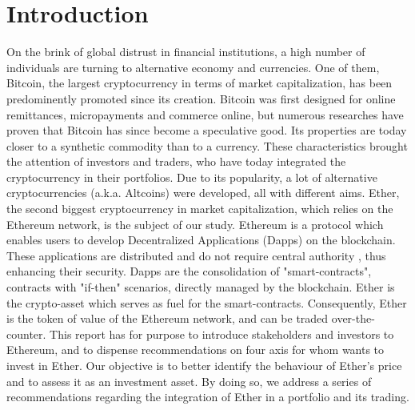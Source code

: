 \documentclass[11pt]{report}
\begin{document}
\chapter*{Introduction}

On the brink of global distrust in financial institutions, a high number of individuals are turning to alternative economy and currencies. One of them, Bitcoin, the largest cryptocurrency in terms of market capitalization, has been predominently  promoted since its creation. Bitcoin was first designed for online remittances, micropayments and commerce online, but numerous researches have proven that Bitcoin has since become a speculative good. Its properties are today closer to a synthetic commodity than to a currency\cite{SELGIN}. These characteristics brought the attention of investors and traders, who have today integrated the cryptocurrency in their portfolios. \medbreak
Due to its popularity, a lot of alternative cryptocurrencies (a.k.a. Altcoins) were developed, all with different aims. Ether, the second biggest cryptocurrency in market capitalization, which relies on the Ethereum network, is the subject of our study.\newline 
Ethereum is a protocol which enables users to develop  Decentralized Applications (Dapps) on the blockchain. These applications are distributed and do not require central authority , thus enhancing their security. Dapps are the consolidation of "smart-contracts", contracts with "if-then" scenarios, directly managed by the blockchain. Ether is the crypto-asset which serves as fuel for the smart-contracts. Consequently, Ether is the token of value of the Ethereum network, and can be traded over-the-counter. \newline
This report has for purpose to introduce stakeholders and investors to Ethereum, and to dispense recommendations on four axis for whom wants to invest in Ether.\newline
Our objective is to better identify the behaviour of Ether’s price and to assess it as an investment asset. By doing so, we address a series of recommendations regarding the integration of Ether in a portfolio and its trading. \clearpage
\end{document}
